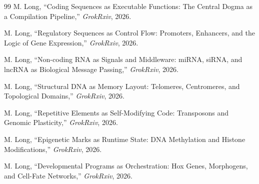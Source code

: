 \documentclass[12pt,a4paper]{article}
\begin{document}
\begin{thebibliography}{99}
M. Long, ``Coding Sequences as Executable Functions: The Central Dogma as a Compilation Pipeline,'' \textit{GrokRxiv}, 2026.

M. Long, ``Regulatory Sequences as Control Flow: Promoters, Enhancers, and the Logic of Gene Expression,'' \textit{GrokRxiv}, 2026.

M. Long, ``Non-coding RNA as Signals and Middleware: miRNA, siRNA, and lncRNA as Biological Message Passing,'' \textit{GrokRxiv}, 2026.

M. Long, ``Structural DNA as Memory Layout: Telomeres, Centromeres, and Topological Domains,'' \textit{GrokRxiv}, 2026.

M. Long, ``Repetitive Elements as Self-Modifying Code: Transposons and Genomic Plasticity,'' \textit{GrokRxiv}, 2026.

M. Long, ``Epigenetic Marks as Runtime State: DNA Methylation and Histone Modifications,'' \textit{GrokRxiv}, 2026.

M. Long, ``Developmental Programs as Orchestration: Hox Genes, Morphogens, and Cell-Fate Networks,'' \textit{GrokRxiv}, 2026.

\end{thebibliography}
\end{document}
